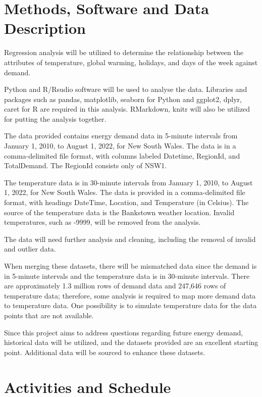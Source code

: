 \documentclass[mstat,12pt]{unswthesis}
\begin{document}
\hypertarget{methods-software-and-data-description}{%
\section{Methods, Software and Data
Description}\label{methods-software-and-data-description}}

Regression analysis will be utilized to determine the relationship
between the attributes of temperature, global warming, holidays, and
days of the week against demand.

Python and R/Rsudio software will be used to analyse the data. Libraries
and packages such as pandas, matplotlib, seaborn for Python and ggplot2,
dplyr, caret for R are required in this analysis. RMarkdown, knitr will
also be utilized for putting the analysis together.

The data provided contains energy demand data in 5-minute intervals from
January 1, 2010, to August 1, 2022, for New South Wales. The data is in
a comma-delimited file format, with columns labeled Datetime, RegionId,
and TotalDemand. The RegionId consists only of NSW1.

The temperature data is in 30-minute intervals from January 1, 2010, to
August 1, 2022, for New South Wales. The data is provided in a
comma-delimited file format, with headings DateTime, Location, and
Temperature (in Celsius). The source of the temperature data is the
Bankstown weather location. Invalid temperatures, such as -9999, will be
removed from the analysis.

The data will need further analysis and cleaning, including the removal
of invalid and outlier data.

When merging these datasets, there will be mismatched data since the
demand is in 5-minute intervals and the temperature data is in 30-minute
intervals. There are approximately 1.3 million rows of demand data and
247,646 rows of temperature data; therefore, some analysis is required
to map more demand data to temperature data. One possibility is to
simulate temperature data for the data points that are not available.

Since this project aims to address questions regarding future energy
demand, historical data will be utilized, and the datasets provided are
an excellent starting point. Additional data will be sourced to enhance
these datasets.

\hypertarget{activities-and-schedule}{%
\section{Activities and Schedule}\label{activities-and-schedule}}
\end{document}
